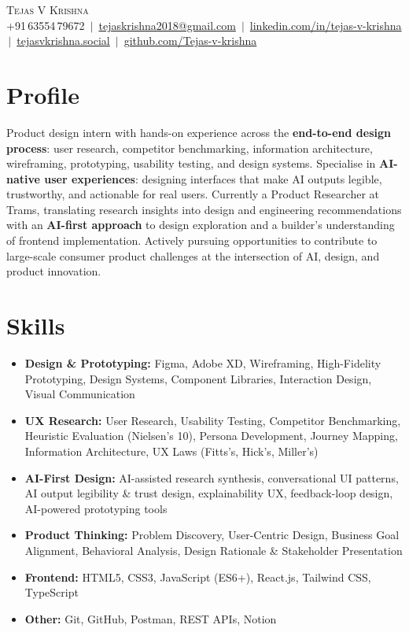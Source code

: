 \documentclass[11pt, letterpaper]{article}
\newcommand{\resumeItem}[1]{%
  \item\small{#1\vspace{-1pt}}%
}
\newcommand{\resumeSubHeadingListStart}{%
  \begin{itemize}[leftmargin=0pt, label={}, itemsep=0pt, parsep=0pt, topsep=2pt]%
}
\newcommand{\resumeSubHeadingListEnd}{\end{itemize}\vspace{-4pt}}
\begin{document}
\begin{center}
  {\Huge\scshape Tejas V Krishna}\\[4pt]
  \small
  +91\,63554\,79672
  \,$|$\,
  \href{mailto:tejaskrishna2018@gmail.com}{tejaskrishna2018@gmail.com}
  \,$|$\,
  \href{https://linkedin.com/in/tejas-v-krishna}{linkedin.com/in/tejas-v-krishna}
  \,$|$\,
  \href{https://www.tejasvkrishna.social}{tejasvkrishna.social}
  \,$|$\,
  \href{https://github.com/Tejas-v-krishna}{github.com/Tejas-v-krishna}
\end{center}
\vspace{-8pt}
\section{Profile}
\small{
Product design intern with hands-on experience across the \textbf{end-to-end design process}: user research, competitor benchmarking, information architecture, wireframing, prototyping, usability testing, and design systems. Specialise in \textbf{AI-native user experiences}: designing interfaces that make AI outputs legible, trustworthy, and actionable for real users. Currently a Product Researcher at Trams, translating research insights into design and engineering recommendations with an \textbf{AI-first approach} to design exploration and a builder's understanding of frontend implementation. Actively pursuing opportunities to contribute to large-scale consumer product challenges at the intersection of AI, design, and product innovation.
}
\section{Skills}
\resumeSubHeadingListStart
  \resumeItem{\textbf{Design \& Prototyping:} Figma, Adobe XD, Wireframing, High-Fidelity Prototyping, Design Systems, Component Libraries, Interaction Design, Visual Communication}
  \resumeItem{\textbf{UX Research:} User Research, Usability Testing, Competitor Benchmarking, Heuristic Evaluation (Nielsen's 10), Persona Development, Journey Mapping, Information Architecture, UX Laws (Fitts's, Hick's, Miller's)}
  \resumeItem{\textbf{AI-First Design:} AI-assisted research synthesis, conversational UI patterns, AI output legibility \& trust design, explainability UX, feedback-loop design, AI-powered prototyping tools}
  \resumeItem{\textbf{Product Thinking:} Problem Discovery, User-Centric Design, Business Goal Alignment, Behavioral Analysis, Design Rationale \& Stakeholder Presentation}
  \resumeItem{\textbf{Frontend:} HTML5, CSS3, JavaScript (ES6+), React.js, Tailwind CSS, TypeScript}
  \resumeItem{\textbf{Other:} Git, GitHub, Postman, REST APIs, Notion}
\resumeSubHeadingListEnd
\end{document}
